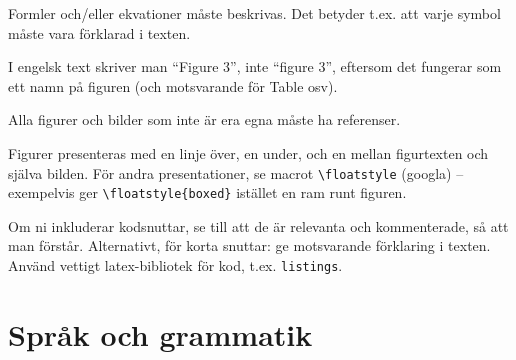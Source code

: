 \documentclass[a4paper,12pt]{article}
\begin{document}
Formler och/eller ekvationer måste beskrivas.  Det betyder t.ex. att varje symbol måste vara förklarad i texten.

I engelsk text skriver man ``Figure 3'', inte ``figure 3'', eftersom det fungerar som ett namn på figuren (och motsvarande för Table osv).

Alla figurer och bilder som inte är era egna måste ha referenser.

Figurer presenteras med en linje över, en under, och en mellan figurtexten och själva bilden. För andra presentationer, se macrot \verb|\floatstyle| (googla) -- exempelvis ger \verb|\floatstyle{boxed}| istället en ram runt figuren.

Om ni inkluderar kodsnuttar, se till att de är relevanta och kommenterade, så att man förstår.  Alternativt, för korta snuttar: ge motsvarande förklaring i texten.
Använd vettigt latex-bibliotek för kod, t.ex. \texttt{listings}.

\section{Språk och grammatik}
\label{sec:sprak-och-grammatik}
\end{document}
